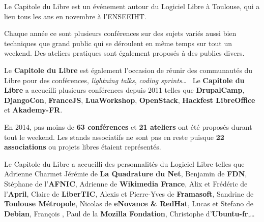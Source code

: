 
Le Capitole du Libre est un événement autour du Logiciel Libre à Toulouse, qui a lieu tous les ans en novembre à l'ENSEEIHT.

Chaque année ce sont plusieurs conférences sur des sujets variés aussi bien techniques que grand public qui se déroulent en même temps sur tout un weekend. Des ateliers pratiques sont également proposés à des publics divers.

Le \textbf{Capitole du Libre} est également l'occasion de réunir des communautés du Libre pour des conférences, \textit{lightning talks}, \textit{coding sprints}\dots ~ Le \textbf{Capitole du Libre} a accueilli plusieurs conférences depuis 2011 telles que \textbf{DrupalCamp}, \textbf{DjangoCon},  \textbf{FranceJS}, \textbf{LuaWorkshop}, \textbf{OpenStack}, \textbf{Hackfest LibreOffice} et \textbf{Akademy-FR}.

En 2014, pas moins de \textbf{63 conférences} et \textbf{21 ateliers} ont été proposés durant tout le weekend. Les stands associatifs ne sont pas en reste puisque \textbf{22 associations} ou projets libres étaient représentés. 

Le Capitole du Libre a accueilli des personnalités du Logiciel Libre telles que Adrienne Charmet Jérémie  de \textbf{La Quadrature du Net}, Benjamin  de \textbf{FDN}, Stéphane  de l'\textbf{AFNIC}, Adrienne  de \textbf{Wikimedia France}, Alix  et Frédéric  de l'\textbf{April}, Claire  de \textbf{LiberTIC}, Alexis  et Pierre-Yves  de \textbf{Framasoft}, Sandrine  de \textbf{Toulouse Métropole}, Nicolas  de \textbf{eNovance \& RedHat}, Lucas  et Stefano  de \textbf{Debian}, François , Paul  de la \textbf{Mozilla Fondation}, Christophe  d'\textbf{Ubuntu-fr},\dots
